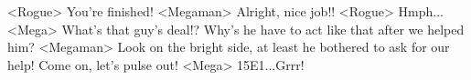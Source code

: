 <Rogue> You're finished! 
<Megaman> Alright, nice job!! 
<Rogue> Hmph... 
<Mega> What's that guy's deal!? Why's he have to act like that after we helped him? 
<Megaman> Look on the bright side, at least he bothered to ask for our help! 
Come on, let's pulse out! 
<Mega> {15}{E1}...Grrr! 
